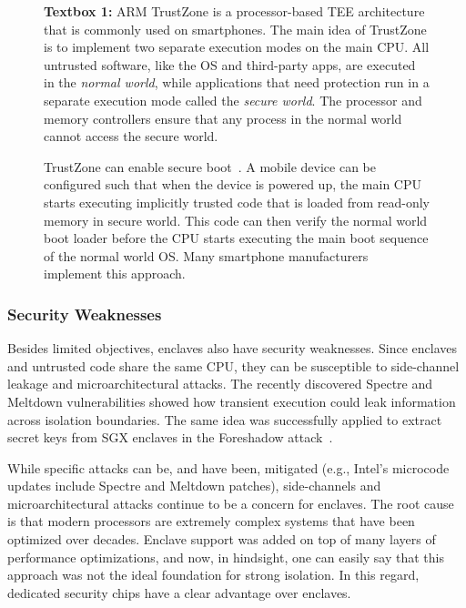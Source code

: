 \begin{figure}
    \begin{tcolorbox}
    \textbf{Textbox 1:} 
    ARM TrustZone is a processor-based TEE architecture that is commonly used on smartphones. The main idea of TrustZone is to implement two separate execution modes on the main CPU. All untrusted software, like the OS and third-party apps, are executed in the \emph{normal world}, while applications that need protection run in a separate execution mode called the \emph{secure world}. The processor and memory controllers ensure that any process in the normal world cannot access the secure world.
    
    \hspace{10pt} TrustZone can enable secure boot~\cite{ekberg2014untapped}. A mobile device can be configured such that when the device is powered up, the main CPU starts executing implicitly trusted code that is loaded from read-only memory in secure world. This code can then verify the normal world boot loader before the CPU starts executing the main boot sequence of the normal world OS. Many smartphone manufacturers implement this approach.
    \end{tcolorbox}
\end{figure}  


\subsubsection*{Security Weaknesses}

Besides limited objectives, enclaves also have security weaknesses. Since enclaves and untrusted code share the same CPU, they can be susceptible to side-channel leakage and microarchitectural attacks. The recently discovered Spectre and Meltdown vulnerabilities showed how transient execution could leak information across isolation boundaries. The same idea was successfully applied to extract secret keys from SGX enclaves in the Foreshadow attack~\cite{van2018foreshadow}. 

While specific attacks can be, and have been, mitigated (e.g., Intel's microcode updates include Spectre and Meltdown patches), side-channels and microarchitectural attacks continue to be a concern for enclaves. The root cause is that modern processors are extremely complex systems that have been optimized over decades. Enclave support was added on top of many layers of performance optimizations, and now, in hindsight, one can easily say that this approach was not the ideal foundation for strong isolation. In this regard, dedicated security chips have a clear advantage over enclaves.

